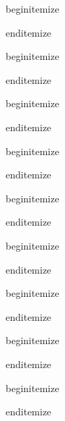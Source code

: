 begin{itemize}
			\item
 			\item
			\item
			\item
			\item
end{itemize}



begin{itemize}
			\item
 			\item
			\item
			\item
			\item
end{itemize}



begin{itemize}
			\item
 			\item
			\item
			\item
			\item
end{itemize}



begin{itemize}
			\item
 			\item
			\item
			\item
			\item
end{itemize}




begin{itemize}
			\item
 			\item
			\item
			\item
			\item
end{itemize}




begin{itemize}
			\item
 			\item
			\item
			\item
			\item
end{itemize}




begin{itemize}
			\item
 			\item
			\item
			\item
			\item
end{itemize}



begin{itemize}
			\item
 			\item
			\item
			\item
			\item
end{itemize}



begin{itemize}
			\item
 			\item
			\item
			\item
			\item
end{itemize}



















